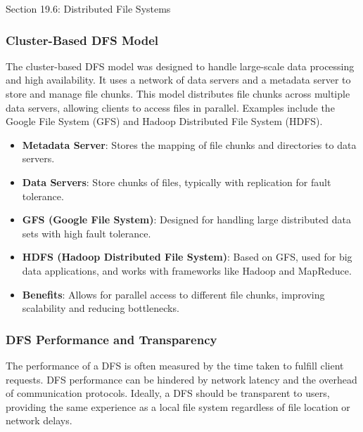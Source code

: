 \begin{notes}{Section 19.6: Distributed File Systems}
\begin{highlight}
    \end{highlight}
    
    \subsubsection*{Cluster-Based DFS Model}
    
    The cluster-based DFS model was designed to handle large-scale data processing and high availability. It uses a network of data servers and a metadata server to store and manage file chunks. This 
    model distributes file chunks across multiple data servers, allowing clients to access files in parallel. Examples include the Google File System (GFS) and Hadoop Distributed File System (HDFS).
    
    \begin{highlight}
    
        \begin{itemize}
            \item \textbf{Metadata Server}: Stores the mapping of file chunks and directories to data servers.
            \item \textbf{Data Servers}: Store chunks of files, typically with replication for fault tolerance.
            \item \textbf{GFS (Google File System)}: Designed for handling large distributed data sets with high fault tolerance.
            \item \textbf{HDFS (Hadoop Distributed File System)}: Based on GFS, used for big data applications, and works with frameworks like Hadoop and MapReduce.
            \item \textbf{Benefits}: Allows for parallel access to different file chunks, improving scalability and reducing bottlenecks.
        \end{itemize}
    
    \end{highlight}
    
    \subsubsection*{DFS Performance and Transparency}
    
    The performance of a DFS is often measured by the time taken to fulfill client requests. DFS performance can be hindered by network latency and the overhead of communication protocols. Ideally, a 
    DFS should be transparent to users, providing the same experience as a local file system regardless of file location or network delays.
    

\end{notes}
